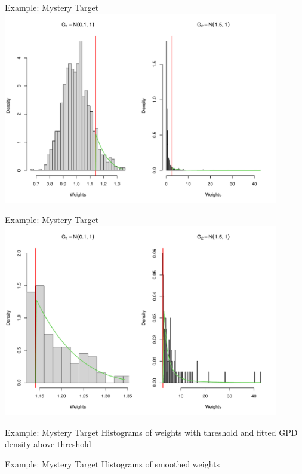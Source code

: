 \documentclass[14pt]{beamer}
\begin{document}
\begin{frame}{Example: Mystery Target}
    \centering
    \includegraphics[height=0.9\textheight, width=0.9\textwidth, keepaspectratio]{Figures/Wt Hist - Pareto Dens.pdf}
\end{frame}

\begin{frame}{Example: Mystery Target}
    \centering
    \includegraphics[height=0.9\textheight, width=0.9\textwidth, keepaspectratio]{Figures/Wt Hist - Pareto Dens Zoom.pdf}
\end{frame}

\begin{frame}{Example: Mystery Target}
    Histograms of weights with threshold and fitted GPD density above threshold
\end{frame}

\begin{frame}{Example: Mystery Target}
    Histograms of smoothed weights
\end{frame}
\end{document}
